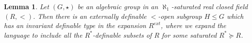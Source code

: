\documentclass[12pt]{article}
\newtheorem{lemme}[thm]{Lemma}
\theoremstyle{definition}
\theoremstyle{mystyle}
\theoremstyle{remark}
\begin{document}

%


\begin{lemme}\label{RCFInvType}
Let $(G, \star)$ be an algebraic group in an $\aleph_1$-saturated real closed field $(R,<)$.
Then there is an externally definable $<$-open subgroup $H\leq
G$ which has an invariant definable type in the expansion
$R^{ext}$, where we expand the language to include all the
$R^*$-definable subsets of $R$ for some saturated $R^*\succeq R$.
\end{lemme}
\end{document}
